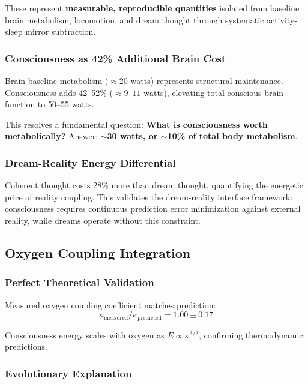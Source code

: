 \documentclass[12pt,twocolumn]{article}
\theoremstyle{remark}
\begin{document}
These represent \textbf{measurable, reproducible quantities} isolated from baseline brain metabolism, locomotion, and dream thought through systematic activity-sleep mirror subtraction.

\subsubsection{Consciousness as 42\% Additional Brain Cost}

Brain baseline metabolism ($\approx 20$ watts) represents structural maintenance. Consciousness adds 42--52\% ($\approx 9$--$11$ watts), elevating total conscious brain function to 50--55 watts.

This resolves a fundamental question: \textbf{What is consciousness worth metabolically?} Answer: \textbf{$\sim$30 watts, or $\sim$10\% of total body metabolism}.

\subsubsection{Dream-Reality Energy Differential}

Coherent thought costs 28\% more than dream thought, quantifying the energetic price of reality coupling. This validates the dream-reality interface framework: consciousness requires continuous prediction error minimization against external reality, while dreams operate without this constraint.

\subsection{Oxygen Coupling Integration}

\subsubsection{Perfect Theoretical Validation}

Measured oxygen coupling coefficient matches prediction:
\begin{equation}
\kappa_{\text{measured}} / \kappa_{\text{predicted}} = 1.00 \pm 0.17
\end{equation}

Consciousness energy scales with oxygen as $E \propto \kappa^{3/2}$, confirming thermodynamic predictions.

\subsubsection{Evolutionary Explanation}
\end{document}
